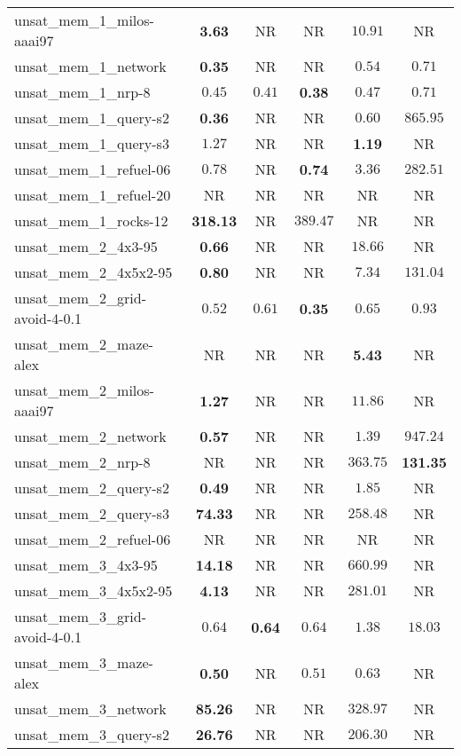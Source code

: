 \begin{tabular}{lccccc}
unsat\_mem\_1\_milos-aaai97 & \textbf{3.63} & NR & NR & $10.91$ & NR \\
unsat\_mem\_1\_network & \textbf{0.35} & NR & NR & $0.54$ & $0.71$ \\
unsat\_mem\_1\_nrp-8 & $0.45$ & $0.41$ & \textbf{0.38} & $0.47$ & $0.71$ \\
unsat\_mem\_1\_query-s2 & \textbf{0.36} & NR & NR & $0.60$ & $865.95$ \\
unsat\_mem\_1\_query-s3 & $1.27$ & NR & NR & \textbf{1.19} & NR \\
unsat\_mem\_1\_refuel-06 & $0.78$ & NR & \textbf{0.74} & $3.36$ & $282.51$ \\
unsat\_mem\_1\_refuel-20 & NR & NR & NR & NR & NR \\
unsat\_mem\_1\_rocks-12 & \textbf{318.13} & NR & $389.47$ & NR & NR \\
unsat\_mem\_2\_4x3-95 & \textbf{0.66} & NR & NR & $18.66$ & NR \\
unsat\_mem\_2\_4x5x2-95 & \textbf{0.80} & NR & NR & $7.34$ & $131.04$ \\
unsat\_mem\_2\_grid-avoid-4-0.1 & $0.52$ & $0.61$ & \textbf{0.35} & $0.65$ & $0.93$ \\
unsat\_mem\_2\_maze-alex & NR & NR & NR & \textbf{5.43} & NR \\
unsat\_mem\_2\_milos-aaai97 & \textbf{1.27} & NR & NR & $11.86$ & NR \\
unsat\_mem\_2\_network & \textbf{0.57} & NR & NR & $1.39$ & $947.24$ \\
unsat\_mem\_2\_nrp-8 & NR & NR & NR & $363.75$ & \textbf{131.35} \\
unsat\_mem\_2\_query-s2 & \textbf{0.49} & NR & NR & $1.85$ & NR \\
unsat\_mem\_2\_query-s3 & \textbf{74.33} & NR & NR & $258.48$ & NR \\
unsat\_mem\_2\_refuel-06 & NR & NR & NR & NR & NR \\
unsat\_mem\_3\_4x3-95 & \textbf{14.18} & NR & NR & $660.99$ & NR \\
unsat\_mem\_3\_4x5x2-95 & \textbf{4.13} & NR & NR & $281.01$ & NR \\
unsat\_mem\_3\_grid-avoid-4-0.1 & $0.64$ & \textbf{0.64} & $0.64$ & $1.38$ & $18.03$ \\
unsat\_mem\_3\_maze-alex & \textbf{0.50} & NR & $0.51$ & $0.63$ & NR \\
unsat\_mem\_3\_network & \textbf{85.26} & NR & NR & $328.97$ & NR \\
unsat\_mem\_3\_query-s2 & \textbf{26.76} & NR & NR & $206.30$ & NR \\

\end{tabular}

